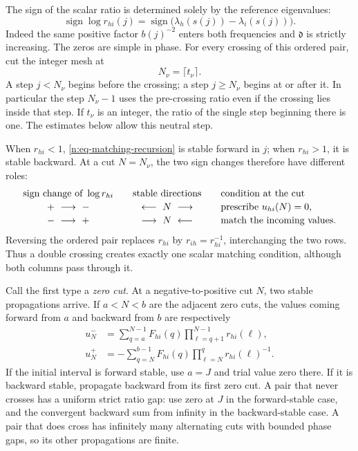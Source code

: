 The sign of the scalar ratio is determined solely by the reference
eigenvalues:
\begin{equation}
 \operatorname{sign}\log r_{hi}(j)
 =\operatorname{sign}\bigl(\lambda_h(s(j))-\lambda_i(s(j))\bigr).
 \label{n:eq-ratio-sign}
\end{equation}
Indeed the same positive factor \(b(j)^{-2}\) enters both frequencies and
\(\mathfrak d\) is strictly increasing.  The zeros are simple in phase.
For every crossing of this ordered pair, cut the integer mesh at
\[
 N_\nu=\lceil t_\nu\rceil.
\]
A step \(j<N_\nu\) begins before the crossing; a step \(j\geq N_\nu\)
begins at or after it.  In particular the step \(N_\nu-1\) uses the
pre-crossing ratio even if the crossing lies inside that step.  If \(t_\nu\)
is an integer, the ratio of the single step beginning there is one.  The
estimates below allow this neutral step.

When \(r_{hi}<1\), \eqref{n:eq-matching-recursion} is stable forward in
\(j\); when \(r_{hi}>1\), it is stable backward.  At a cut \(N=N_\nu\),
the two sign changes therefore have different roles:
\[
 \begin{array}{c@{\qquad}c@{\qquad}l}
  \text{sign change of }\log r_{hi}
    &\text{stable directions}&\text{condition at the cut}\\[2pt]
  +\ \longrightarrow\ -
    &\longleftarrow\ N\ \longrightarrow
    &\text{prescribe }u_{hi}(N)=0,\\[2pt]
  -\ \longrightarrow\ +
    &\longrightarrow\ N\ \longleftarrow
    &\text{match the incoming values}.
 \end{array}
\]
Reversing the ordered pair replaces \(r_{hi}\) by
\(r_{ih}=r_{hi}^{-1}\), interchanging the two rows.  Thus a double crossing
creates exactly one scalar matching condition, although both columns pass
through it.

Call the first type a \emph{zero cut}.  At a negative-to-positive cut
\(N\), two stable propagations arrive.  If
\(a<N<b\) are the adjacent zero cuts, the values
coming forward from \(a\) and backward from \(b\) are respectively
\begin{align}
 u_N^-&=\sum_{q=a}^{N-1}F_{hi}(q)
           \prod_{\ell=q+1}^{N-1}r_{hi}(\ell),
 \label{n:eq-forward-trial}\\
 u_N^+&=-\sum_{q=N}^{b-1}F_{hi}(q)
           \prod_{\ell=N}^{q}r_{hi}(\ell)^{-1}.
 \label{n:eq-backward-trial}
\end{align}
If the initial interval is forward stable, use \(a=J\) and trial value
zero there.  If it is backward stable, propagate backward from its first
zero cut.  A pair that never crosses has a uniform strict ratio gap:
use zero at \(J\) in the forward-stable case, and the convergent backward
sum from infinity in the backward-stable case.  A pair that does cross has
infinitely many alternating cuts with bounded phase gaps, so its other
propagations are finite.

